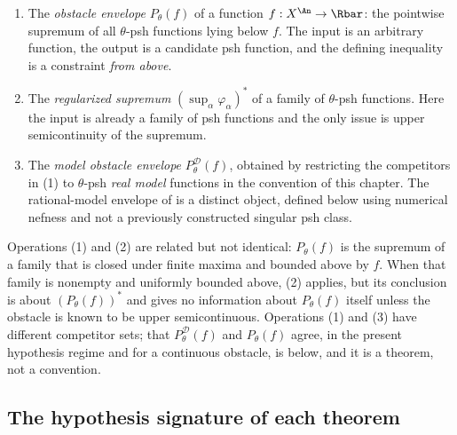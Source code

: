 \begin{enumerate}
\item The \emph{obstacle envelope} $P_\theta(f)$ of a function
$f:X^{\An}\to\Rbar$: the pointwise supremum of all $\theta$-psh
functions lying below $f$.  The input is an arbitrary function, the output
is a candidate psh function, and the defining inequality is a constraint
\emph{from above}.
\item The \emph{regularized supremum} $(\sup_\alpha\varphi_\alpha)^*$ of a
family of $\theta$-psh functions.  Here the input is already a family of
psh functions and the only issue is upper semicontinuity of the supremum.
\item The \emph{model obstacle envelope} $P^{\mathcal D}_\theta(f)$,
obtained by restricting the competitors in (1) to $\theta$-psh
\emph{real model} functions in the convention of this chapter.
The rational-model envelope of
\cite[Definition~2.8]{GJKM19} is a distinct object, defined below using
numerical nefness and not a previously constructed singular psh class.
\end{enumerate}

Operations (1) and (2) are related but not identical: $P_\theta(f)$ is the
supremum of a family that is closed under finite maxima and bounded above by
$f$.  When that family is nonempty and uniformly bounded above, (2) applies,
but its conclusion is about
$(P_\theta(f))^*$ and gives no information about $P_\theta(f)$ itself
unless the obstacle is known to be upper semicontinuous.  Operations (1) and
(3) have different competitor sets; that
$P^{\mathcal D}_\theta(f)$ and $P_\theta(f)$ agree, in the present
hypothesis regime and for a continuous obstacle, is
 below, and it is a theorem, not a
convention.

\begin{center}
\end{center}

\subsection{The hypothesis signature of each theorem}
\label{sec:ch23-signature}

